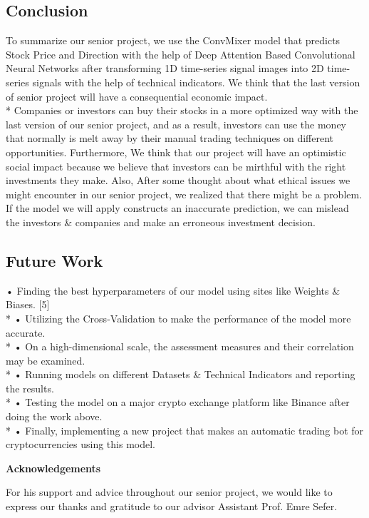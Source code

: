 \documentclass{article}
\begin{document}
\subsection{Conclusion}
To summarize our senior project, we use the ConvMixer model that predicts Stock Price and Direction with the help of Deep Attention Based Convolutional Neural Networks after transforming 1D time-series signal images into 2D time-series signals with the help of technical indicators. We think that the last version of senior project will have a consequential economic impact. \vspace{0.4cm} \\*
Companies or investors can buy their stocks in a more optimized way with the last version of our senior project, and as a result, investors can use the money that normally is melt away by their manual trading techniques on different opportunities. Furthermore, We think that our project will have an optimistic social impact because we believe that investors can be mirthful with the right investments they make. Also, After some thought about what ethical issues we might encounter in our senior project, we realized that there might be a problem. If the model we will apply constructs an inaccurate prediction, we can mislead the investors \& companies and make an erroneous investment decision.
\subsection{Future Work}
• Finding the best hyperparameters of our model using sites like Weights \& Biases. [5]\\*
• Utilizing the Cross-Validation to make the performance of the model more accurate.\\*
• On a high-dimensional scale, the assessment measures and their correlation may be examined.\\*
• Running models on different Datasets \& Technical Indicators and reporting the results.\\*
• Testing the model on a major crypto exchange platform like Binance after doing the work above.\\*
• Finally, implementing a new project that makes an automatic trading bot for cryptocurrencies using this model.

\begin{center}
    \textbf{\Large Acknowledgements}
\end{center}
For his support and advice throughout our senior project, we would like to express our thanks and gratitude to our advisor Assistant Prof. Emre Sefer.
\end{document}
